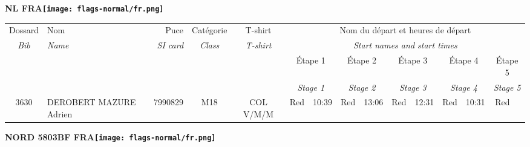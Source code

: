 \documentclass{report}
\begin{document}
\newpage
  \Huge \centering \bfseries NL  FRA\normalfont \footnotesize \sffamily \hfill \texttt{[image: flags-normal/fr.png]} \newline 
  \begin{longtable}{|c|l|r|c|c|*{5}{cc|}}
    Dossard & Nom  & Puce    & Catégorie & T-shirt & \multicolumn{10}{c|}{Nom du départ et heures de départ} \\
    \itshape Bib     & \itshape Name & \itshape SI card & \itshape Class  & \itshape  T-shirt  & \multicolumn{10}{c|}{\itshape Start names and start times} \\
    \hline
    & & & & & \multicolumn{2}{c|}{Étape 1} & \multicolumn{2}{c|}{Étape 2} & \multicolumn{2}{c|}{Étape 3} & \multicolumn{2}{c|}{Étape 4} & \multicolumn{2}{c|}{Étape 5} \\
    & & & & & \multicolumn{2}{c|}{\itshape Stage 1} & \multicolumn{2}{c|}{\itshape Stage 2} & \multicolumn{2}{c|}{\itshape Stage 3} & \multicolumn{2}{c|}{\itshape Stage 4} & \multicolumn{2}{c|}{\itshape Stage 5} \\
    \hline
    3630 & DEROBERT MAZURE Adrien & 7990829 & M18 & COL V/M/M & Red & 10:39 & Red & 13:06 & Red & 12:31 & Red & 10:31 & Red &  \\
  \end{longtable}
\newpage
  \Huge \centering \bfseries NORD 5803BF FRA\normalfont \footnotesize \sffamily \hfill \texttt{[image: flags-normal/fr.png]} \newline 
\end{document}
